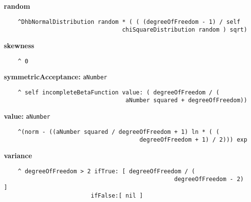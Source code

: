 {\bf random}
\begin{verbatim}
    ^DhbNormalDistribution random * ( ( (degreeOfFreedom - 1) / self 
                                  chiSquareDistribution random ) sqrt)
\end{verbatim}
{\bf skewness}
\begin{verbatim}
    ^ 0
\end{verbatim}
{\bf symmetricAcceptance:} {\tt aNumber}
\begin{verbatim}
    ^ self incompleteBetaFunction value: ( degreeOfFreedom / ( 
                                   aNumber squared + degreeOfFreedom))
\end{verbatim}
{\bf value:} {\tt aNumber}
\begin{verbatim}
    ^(norm - ((aNumber squared / degreeOfFreedom + 1) ln * ( ( 
                                       degreeOfFreedom + 1) / 2))) exp
\end{verbatim}
{\bf variance}
\begin{verbatim}
    ^ degreeOfFreedom > 2 ifTrue: [ degreeOfFreedom / ( 
                                                 degreeOfFreedom - 2) ]
                         ifFalse:[ nil ]
\end{verbatim}

